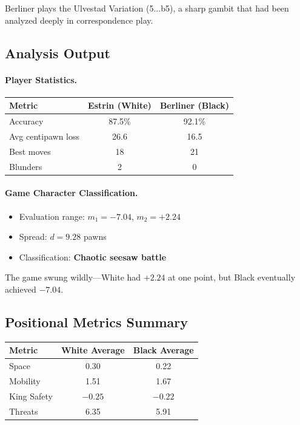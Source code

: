 \documentclass[12pt]{book}
\begin{document}
Berliner plays the Ulvestad Variation (5...b5), a sharp gambit that had been analyzed deeply in correspondence play.

\subsection{Analysis Output}

\paragraph{Player Statistics.}

\begin{center}
\begin{tabular}{lcc}
\toprule
\textbf{Metric} & \textbf{Estrin (White)} & \textbf{Berliner (Black)} \\
\midrule
Accuracy & 87.5\% & 92.1\% \\
Avg centipawn loss & 26.6 & 16.5 \\
Best moves & 18 & 21 \\
Blunders & 2 & 0 \\
\bottomrule
\end{tabular}
\end{center}

\paragraph{Game Character Classification.}
\begin{itemize}
    \item Evaluation range: $m_1 = -7.04$, $m_2 = +2.24$
    \item Spread: $d = 9.28$ pawns
    \item Classification: \textbf{Chaotic seesaw battle}
\end{itemize}

The game swung wildly---White had $+2.24$ at one point, but Black eventually achieved $-7.04$.

\subsection{Positional Metrics Summary}

\begin{center}
\begin{tabular}{lcc}
\toprule
\textbf{Metric} & \textbf{White Average} & \textbf{Black Average} \\
\midrule
Space & 0.30 & 0.22 \\
Mobility & 1.51 & 1.67 \\
King Safety & $-0.25$ & $-0.22$ \\
Threats & 6.35 & 5.91 \\
\bottomrule
\end{tabular}
\end{center}
\end{document}
